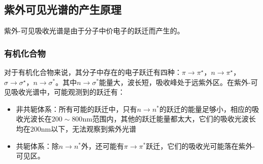 \subsection{紫外可见光谱的产生原理}
紫外-可见吸收光谱是由于分子中价电子的跃迁而产生的。
\subsubsection*{有机化合物}
对于有机化合物来说，其分子中存在的电子跃迁有四种：$\pi \rightarrow \pi^{\star}$，$n\rightarrow \pi^{\star}$，$\sigma \rightarrow  \sigma^{\star}$，$n\rightarrow \sigma^{*}$。其中$n\rightarrow\sigma^{*}$能量大，波长短，吸收峰处于远紫外区。在紫外-可见吸收光谱中，可能观测到的跃迁有：
\begin{itemize}
    \item 非共轭体系：所有可能的跃迁中，只有$n\rightarrow n^{*}$的跃迁的能量足够小，相应的吸收光波长在$200\sim 800 \mathrm{nm}$范围内，其他的跃迁能量都太大，它们的吸收光波长均在$200 \mathrm{nm}$以下，无法观察到紫外光谱
    \item 共轭体系：除$n\rightarrow n^{*}$外，还可能有$\pi \rightarrow \pi^{*}$跃迁，它们的吸收光可能落在紫外-可见区。
\end{itemize}
